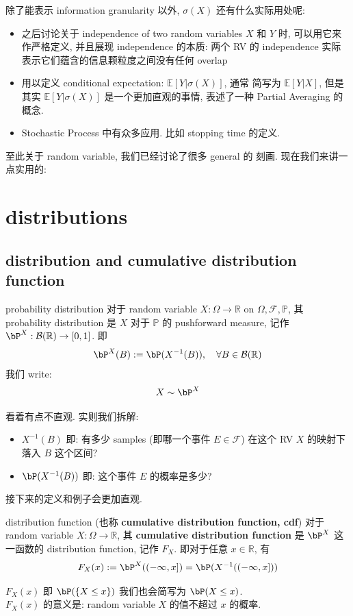 除了能表示 information granularity 以外,
 \(\sigma(X)\) 还有什么实际用处呢:
 \begin{itemize}
    \item 之后讨论关于 independence of two random variables \(X\) 和 \(Y\) 时, 
    可以用它来作严格定义, 并且展现 independence 的本质: 两个 RV 的 independence 实际表示它们蕴含的信息颗粒度之间没有任何 overlap
    \item 用以定义 conditional expectation: $\mathbb{E}[Y | \sigma(X)]$, 通常
    简写为 $\mathbb{E}[Y | X]$, 但是其实 $\mathbb{E}[Y | \sigma(X)]$ 
    是一个更加直观的事情, 表述了一种 Partial Averaging 的概念.
    \item Stochastic Process 中有众多应用. 比如 stopping time 的定义.
 \end{itemize}

至此关于 random variable, 我们已经讨论了很多 general 的
刻画. 现在我们来讲一点实用的:

\section{distributions}
\subsection{distribution and cumulative distribution function}
\begin{definition}{probability distribution}
    对于 random variable \(X: \Omega \to \mathbb{R}\) on \(\Omega, \mathcal{F}, \mathbb{P}\), 
    其 probability distribution 是 \(X\) 对于 \(\mathbb{P}\) 的 pushforward measure, 
    记作 \(\bP^X: \mathcal{B}(\mathbb{R}) \to [0,1]\). 即
    \[
    \bP^X(B) := \bP(X^{-1}(B)), \quad \forall B \in \mathcal{B}(\mathbb{R})
    \]
    我们 write:
    \[
    X \sim \bP^X
    \]
\end{definition}
\begin{remark}
    看着有点不直观. 实则我们拆解:
    \begin{itemize}
        \item \(X^{-1}(B)\) 即: 有多少 samples (即哪一个事件 \(E\in\mathcal{F}\)) 在这个 RV $X$ 的映射下落入 \(B\) 这个区间?
        \item \(\bP(X^{-1}(B))\) 即: 这个事件 \(E\) 的概率是多少?
    \end{itemize}
    接下来的定义和例子会更加直观.
\end{remark}
\begin{definition}{distribution function (也称 \textbf{cumulative distribution function, cdf})}
    对于 random variable \(X: \Omega \to \mathbb{R}\), 
    其 \textbf{cumulative distribution function} 是 \(\bP^X\) 这一函数的 distribution function, 
    记作 \(F_X\). 即对于任意 \(x \in \mathbb{R}\), 有
    \[
    F_X(x) := \bP^X((-\infty,x]) = \bP(X^{-1}((-\infty,x]))
    \]
\end{definition}
\begin{remark}
    \(F_X(x)\) 即 \(\bP(\{X\leq x\})\) 我们也会简写为 \(\bP(X \leq x)\).\\
    \(F_X(x)\) 的意义是: random variable \(X\) 的值不超过 \(x\) 的概率.\\
\end{remark}



